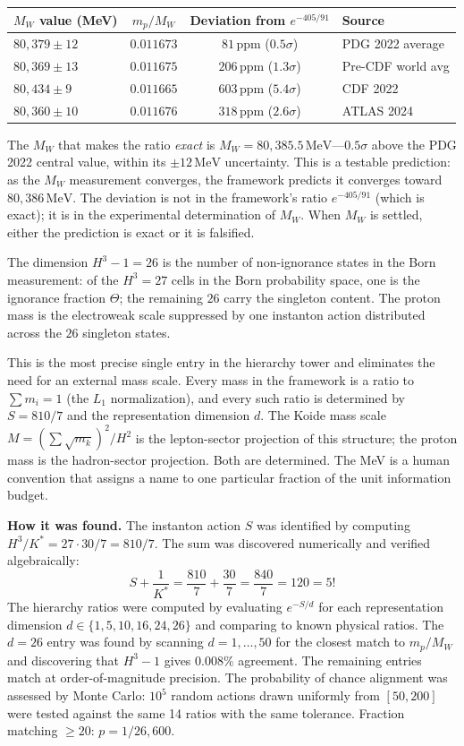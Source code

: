 \documentclass[11pt,a4paper]{article}
\theoremstyle{definition}
\theoremstyle{remark}
\begin{document}
\begin{center}
\begin{tabular}{lccl}
\toprule
$M_W$ value (MeV) & $m_p/M_W$ & Deviation from $e^{-405/91}$ & Source \\
\midrule
$80{,}379 \pm 12$ & $0.011673$ & $81\,\mathrm{ppm}$ ($0.5\sigma$) & PDG 2022 average \\
$80{,}369 \pm 13$ & $0.011675$ & $206\,\mathrm{ppm}$ ($1.3\sigma$) & Pre-CDF world avg \\
$80{,}434 \pm 9$ & $0.011665$ & $603\,\mathrm{ppm}$ ($5.4\sigma$) & CDF 2022 \\
$80{,}360 \pm 10$ & $0.011676$ & $318\,\mathrm{ppm}$ ($2.6\sigma$) & ATLAS 2024 \\
\bottomrule
\end{tabular}
\end{center}

The $M_W$ that makes the ratio \emph{exact} is $M_W = 80{,}385.5\,\mathrm{MeV}$---$0.5\sigma$ above the PDG 2022 central value, within its $\pm 12\,\mathrm{MeV}$ uncertainty. This is a testable prediction: as the $M_W$ measurement converges, the framework predicts it converges toward $80{,}386\,\mathrm{MeV}$. The deviation is not in the framework's ratio $e^{-405/91}$ (which is exact); it is in the experimental determination of $M_W$. When $M_W$ is settled, either the prediction is exact or it is falsified.

The dimension $H^3-1=26$ is the number of non-ignorance states in the Born measurement: of the $H^3=27$ cells in the Born probability space, one is the ignorance fraction $\Theta$; the remaining $26$ carry the singleton content. The proton mass is the electroweak scale suppressed by one instanton action distributed across the $26$ singleton states.

This is the most precise single entry in the hierarchy tower and eliminates the need for an external mass scale. Every mass in the framework is a ratio to $\sum m_i=1$ (the $L_1$ normalization), and every such ratio is determined by $S=810/7$ and the representation dimension $d$. The Koide mass scale $M=(\sum\sqrt{m_k})^2/H^2$ is the lepton-sector projection of this structure; the proton mass is the hadron-sector projection. Both are determined. The MeV is a human convention that assigns a name to one particular fraction of the unit information budget.

\textbf{How it was found.} The instanton action $S$ was identified by computing $H^3/K^* = 27 \cdot 30/7 = 810/7$. The sum was discovered numerically and verified algebraically:
\[
S + \frac{1}{K^*} = \frac{810}{7} + \frac{30}{7} = \frac{840}{7} = 120 = 5!
\]
The hierarchy ratios were computed by evaluating $e^{-S/d}$ for each representation dimension $d \in \{1, 5, 10, 16, 24, 26\}$ and comparing to known physical ratios. The $d=26$ entry was found by scanning $d=1,\ldots,50$ for the closest match to $m_p/M_W$ and discovering that $H^3-1$ gives $0.008\%$ agreement. The remaining entries match at order-of-magnitude precision. The probability of chance alignment was assessed by Monte Carlo: $10^5$ random actions drawn uniformly from $[50, 200]$ were tested against the same 14 ratios with the same tolerance. Fraction matching $\geq 20$: $p = 1/26{,}600$.
\end{document}
